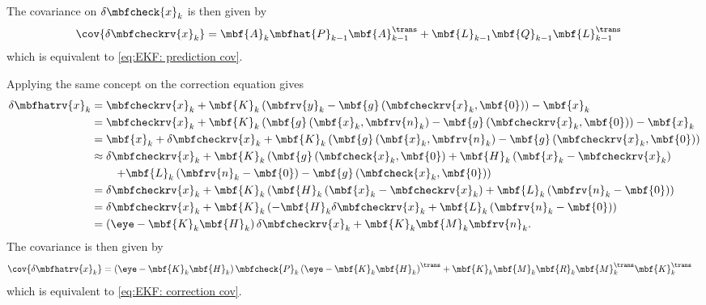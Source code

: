 \documentclass[nobib, nofonts, notoc]{tufte-handout}
\begin{document}
    The covariance on $\delta\mbfcheck{x}_{k}$ is then given by
    \begin{align}
        \cov{\delta\mbfcheckrv{x}_{k}} &= \mbf{A}_{k}\mbfhat{P}_{k-1}\mbf{A}_{k-1}^{\trans} + \mbf{L}_{k-1}\mbf{Q}_{k-1}\mbf{L}_{k-1}^{\trans}
    \end{align}
    which is equivalent to \eqref{eq:EKF: prediction cov}.

    Applying the same concept on the correction equation gives
    \begin{align}
        \delta\mbfhatrv{x}_{k} 
        &= \mbfcheckrv{x}_{k} + \mbf{K}_{k}\left( \mbfrv{y}_{k} - \mbf{g}\left( \mbfcheckrv{x}_{k}, \mbf{0} \right) \right) - \mbf{x}_{k}\\
        &= \mbfcheckrv{x}_{k} + \mbf{K}_{k}\left( \mbf{g}\left( \mbf{x}_{k},\mbfrv{n}_{k} \right) - \mbf{g}\left( \mbfcheckrv{x}_{k}, \mbf{0} \right) \right) - \mbf{x}_{k}\\
        &= \mbf{x}_{k} + \delta\mbfcheckrv{x}_{k} + \mbf{K}_{k}\left( \mbf{g}\left( \mbf{x}_{k},\mbfrv{n}_{k} \right) - \mbf{g}\left( \mbfcheckrv{x}_{k}, \mbf{0} \right) \right)\\
        &\approx \delta\mbfcheckrv{x}_{k} +\mbf{K}_{k}\left( \mbf{g}\left( \mbfcheck{x}_{k}, \mbf{0} \right) + \mbf{H}_{k}\left( \mbf{x}_{k} - \mbfcheckrv{x}_{k} \right) \right.\nonumber\\&\qquad \left.+ \mbf{L}_{k}\left( \mbfrv{n}_{k}-\mbf{0} \right) - \mbf{g}\left( \mbfcheck{x}_{k},\mbf{0} \right) \right)\\
        &= \delta\mbfcheckrv{x}_{k} +\mbf{K}_{k}\left( \mbf{H}_{k}\left( \mbf{x}_{k} - \mbfcheckrv{x}_{k} \right) + \mbf{L}_{k}\left( \mbfrv{n}_{k}-\mbf{0} \right) \right)\\
        &= \delta\mbfcheckrv{x}_{k} +\mbf{K}_{k}\left( -\mbf{H}_{k}\delta\mbfcheckrv{x}_{k} + \mbf{L}_{k}\left( \mbfrv{n}_{k}-\mbf{0} \right) \right)\\
        &= \left( \eye - \mbf{K}_{k}\mbf{H}_{k} \right)\delta\mbfcheckrv{x}_{k} + \mbf{K}_{k}\mbf{M}_{k}\mbfrv{n}_{k}.
    \end{align}
    The covariance is then given by
    \begin{align}
        \cov{\delta\mbfhatrv{x}_{k}} &= \left( \eye - \mbf{K}_{k}\mbf{H}_{k} \right)\mbfcheck{P}_{k}\left( \eye - \mbf{K}_{k}\mbf{H}_{k} \right)^{\trans} + \mbf{K}_{k}\mbf{M}_{k}\mbf{R}_{k}\mbf{M}_{k}^{\trans}\mbf{K}_{k}^{\trans}
    \end{align}
    which is equivalent to \eqref{eq:EKF: correction cov}.
\end{document}
